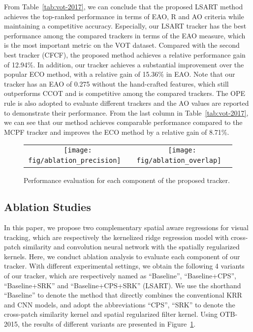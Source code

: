 \documentclass[10pt,twocolumn,letterpaper]{article}
\begin{document}
From Table~\ref{tab:vot-2017}, we can conclude that the proposed LSART
method achieves the top-ranked performance in terms of EAO, R and AO criteria
while maintaining a competitive accuracy.
Especially, our LSART tracker has the best performance among the compared trackers in terms of
the EAO measure, which is the most important metric on the VOT dataset.
Compared with the second best tracker (CFCF), the proposed method achieves a relative
performance gain of 12.94\%.
In addition, our tracker achieves a  substantial improvement over the popular ECO method,
with a relative gain of 15.36\% in EAO.
Note that our tracker has an EAO of 0.275 without the hand-crafted features, which still outperforms
CCOT and is competitive among the compared trackers.
The OPE rule is also adopted to evaluate different trackers and the AO values are reported to
demonstrate their performance.
From the last column in Table~\ref{tab:vot-2017}, we can see that our method achieves comparable
performance compared to the MCPF tracker and improves the ECO method by a relative gain of 8.71\%.

\begin{figure}[h]
\centering
\begin{tabular}{c@{}c}
\texttt{[image: fig/ablation\_precision]}
\ &
\texttt{[image: fig/ablation\_overlap]}
\ \\
\end{tabular}
\caption{Performance evaluation for each component of the proposed tracker. }
\label{fig:analysis}
\vspace{-2mm}
\end{figure}

\vspace{1.05mm}
\subsection{Ablation Studies}
\label{sec:6-5}
In this paper, we propose two complementary spatial aware regressions for visual tracking, which are respectively
the kernelized ridge regression model with cross-patch similarity and convolution neural network with the spatially
regularized kernels.
Here, we conduct ablation analysis to evaluate each component of our tracker. With different experimental settings,
we obtain the following 4 variants of our tracker, which are respectively
named as ``Baseline'', ``Baseline+CPS'', ``Baseline+SRK'' and ``Baseline+CPS+SRK'' (LSART).
We use the shorthand ``Baseline'' to denote the method that directly combines the conventional KRR and  CNN models,
and adopt the abbreviations ``CPS'', ``SRK'' to denote the cross-patch similarity kernel and spatial regularized filter kernel.
Using OTB-2015, the results of different variants are presented in Figure~\ref{fig:analysis}.
\end{document}
